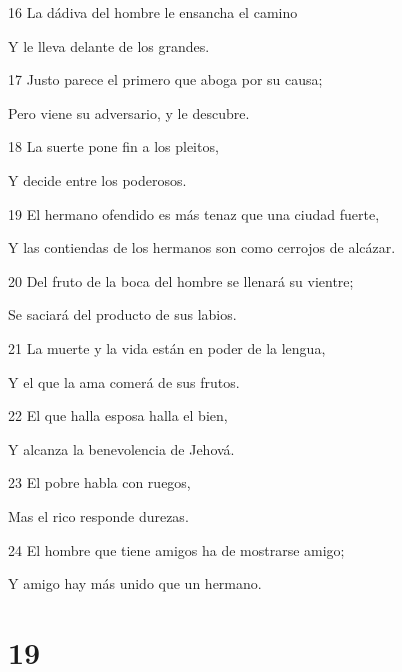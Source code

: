 \par 16 La dádiva del hombre le ensancha el camino
\par Y le lleva delante de los grandes.
\par 17 Justo parece el primero que aboga por su causa;
\par Pero viene su adversario, y le descubre.
\par 18 La suerte pone fin a los pleitos,
\par Y decide entre los poderosos.
\par 19 El hermano ofendido es más tenaz que una ciudad fuerte,
\par Y las contiendas de los hermanos son como cerrojos de alcázar.
\par 20 Del fruto de la boca del hombre se llenará su vientre;
\par Se saciará del producto de sus labios.
\par 21 La muerte y la vida están en poder de la lengua,
\par Y el que la ama comerá de sus frutos.
\par 22 El que halla esposa halla el bien,
\par Y alcanza la benevolencia de Jehová.
\par 23 El pobre habla con ruegos,
\par Mas el rico responde durezas.
\par 24 El hombre que tiene amigos ha de mostrarse amigo;
\par Y amigo hay más unido que un hermano.

\chapter{19}

